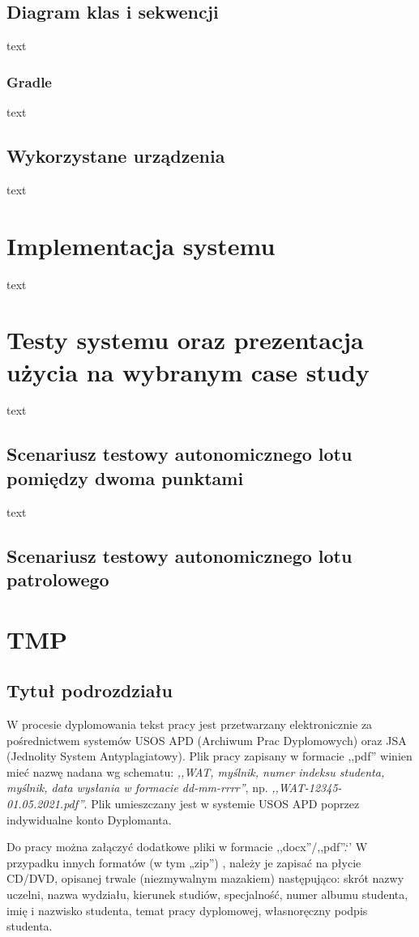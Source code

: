 \subsection{Diagram klas i sekwencji}
text
\subsubsection{Gradle}
text
\subsection{Wykorzystane urządzenia}
text

\newpage
\section{Implementacja systemu}
text

\newpage
\section{Testy systemu oraz prezentacja użycia na wybranym case study}
text
\subsection{Scenariusz testowy autonomicznego lotu pomiędzy dwoma punktami}
text
\subsection{Scenariusz testowy autonomicznego lotu patrolowego}

\newpage
\section{TMP}

\subsection{Tytuł podrozdziału}
W procesie dyplomowania tekst pracy jest przetwarzany elektronicznie za pośrednictwem systemów USOS APD (Archiwum Prac Dyplomowych) oraz JSA (Jednolity System Antyplagiatowy). Plik pracy zapisany w formacie ,,pdf'' winien mieć nazwę nadana wg schematu: \textit{,,WAT, myślnik, numer indeksu studenta, myślnik, data wysłania w formacie dd-mm-rrrr''}, np. \textit{,,WAT-12345-01.05.2021.pdf''}. Plik umieszczany jest w systemie USOS APD poprzez indywidualne konto Dyplomanta.

Do pracy można załączyć dodatkowe pliki w formacie ,,docx''/,,pdf''.`'
W przypadku innych formatów (w tym „zip”) , należy je zapisać na płycie CD/DVD, opisanej trwale (niezmywalnym mazakiem) następująco: skrót nazwy uczelni, nazwa wydziału, kierunek studiów, specjalność, numer albumu studenta, imię i nazwisko studenta, temat pracy dyplomowej, własnoręczny podpis studenta. 

